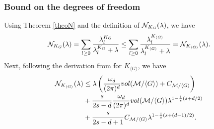 \subsubsection{Bound on the degrees of freedom}
Using Theorem \ref{theoN} and the definition of $\mathcal{N}_{K_G}(\lambda)$, we have
\begin{align}
    \mathcal{N}_{K_G}(\lambda) = \sum_{l\ge 0}\frac{\lambda_l^{K_G}}{\lambda_l^{K_G}+\lambda}
    \le \sum_{l\ge 0}\frac{\lambda_l^{K_{\langle G\rangle}}}{\lambda_l^{K_{\langle G\rangle}}+\lambda}=\mathcal{N}_{K_{\langle G\rangle}}(\lambda).
\end{align}
Next, following the derivation from \cite{tahmasebi2023exact} for $K_{\langle G\rangle}$, we have
\begin{align}
\begin{alignedat}{3}
    \mathcal{N}_{K_{\langle G\rangle}}(\lambda)
    &\le \lambda \left(\frac{\omega_d}{(2\pi)^d}vol(\mathcal{M}/\langle G\rangle) + C_{\mathcal{M}/\langle G\rangle}\right) \\
    &+ \frac{s}{2s-d}\frac{\omega_d}{(2\pi)^d}vol(\mathcal{M}/\langle G\rangle)\lambda^{1-\frac{1}{s}(s+d/2)}\\
    &+\frac{s}{2s-d+1}C_{\mathcal{M}/\langle G\rangle}\lambda^{1-\frac{1}{s}(s+(d-1)/2)}.
\end{alignedat}
\end{align}

